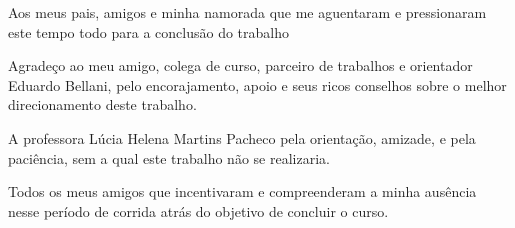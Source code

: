 \documentclass[a4paper,12pt]{monografia}
\begin{document}
    

  \bacharelado {} 
  \data{\today} %

   
  
  
  
  \examinadorum{}
  \ttexaminadorum{}
  
  
  \maketitle
  
  \begin{dedicatoria}
  Aos meus pais, amigos e minha namorada que me aguentaram e pressionaram este tempo todo para a conclusão do trabalho \\
  \end{dedicatoria}
  

  \indent\indent Agradeço ao meu amigo, colega de curso, parceiro de trabalhos e orientador Eduardo Bellani, pelo encorajamento, apoio e seus ricos conselhos sobre o melhor direcionamento deste trabalho.
  
  A professora Lúcia Helena Martins Pacheco pela orientação, amizade, e pela paciência, sem a qual este trabalho não se realizaria.
  
  Todos os meus amigos que incentivaram e compreenderam a minha ausência nesse período de corrida atrás do objetivo de concluir o curso.
  
  \newpage
  
  \tableofcontents
  
  \listoffigures
  
  \listoftables

  
  
  
  
  
  
  
  
\end{document}
